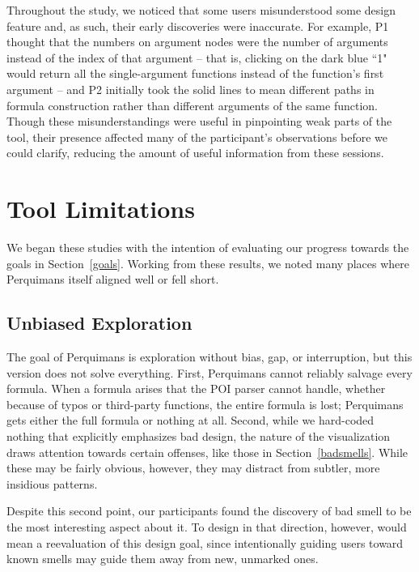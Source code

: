 \documentclass[conference]{IEEEtran}
\newcommand{\toolname}{Perquimans\xspace} \newcommand{\toolnameend}{Perquimans}
\begin{document}
	Throughout the study, we noticed that some users misunderstood some design feature
	and, as such, their early discoveries were inaccurate. For example, P1
	thought that the numbers on argument nodes were the number of arguments instead
	of the index of that argument -- that is, clicking on the dark blue
	``1" would return all the single-argument functions instead of the function's
	first argument -- and P2 initially took the solid lines to mean
	different paths in formula construction rather than different arguments of the
	same function. Though these misunderstandings were useful in pinpointing weak
	parts of the tool, their presence affected many of the participant's observations before we
	could clarify, reducing the amount of useful information from these sessions.
	
	\section{Tool Limitations} 
	
	We began these studies with the intention of evaluating
	our progress towards the goals in Section~\ref{goals}. Working from these
	results, we noted many places where \toolname itself aligned well or fell short.
	
	\subsection{Unbiased Exploration} 
	
	The goal of \toolname is exploration without bias, gap, or interruption, but 
	this version does not solve everything. First, \toolname cannot reliably
	salvage every formula. When a formula arises that the POI parser cannot handle,
	whether because of typos or third-party functions, the entire formula is lost;
	\toolname gets either the full formula or nothing at all. Second, while we 
	hard-coded nothing that explicitly emphasizes bad design, the nature of the
	visualization draws attention towards certain offenses, like those in
	Section~\ref{badsmells}. While these may be fairly obvious, however, they 
	may distract from subtler, more insidious patterns.
	
	Despite this second point, our participants found the discovery of bad smell
	to be the most interesting aspect about it. To design in that
	direction, however, would mean a reevaluation of this design goal, since
	intentionally guiding users toward known smells may guide them away from new,
	unmarked ones.
	
\end{document}
